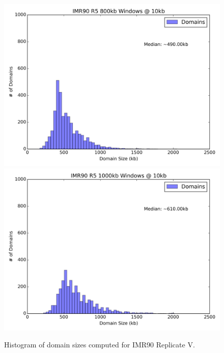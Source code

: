 \begin{figure}[H]
  \begin{minipage}{0.5\textwidth}%
    \includegraphics[width=\textwidth]{./figures/supplementary/domains/size800kb.png}
  \end{minipage}%
  \hfill
  \begin{minipage}{0.5\textwidth}
    \includegraphics[width=\textwidth]{./figures/supplementary/domains/size1000kb.png}
  \end{minipage}
  \medskip
  \small
  Histogram of domain sizes computed for IMR90 Replicate V.
\end{figure}

